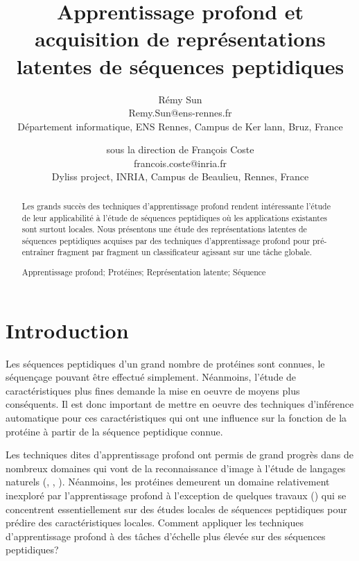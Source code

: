 \documentclass[a4paper, 11pt, onecolumn]{article}
\title{Apprentissage profond et acquisition de représentations latentes de séquences peptidiques}
\author{Rémy Sun \\
  Remy.Sun@ens-rennes.fr \\
  Département informatique, ENS Rennes, Campus de Ker lann, Bruz, France
\and
  sous la direction de Fran\c{c}ois Coste \\
  francois.coste@inria.fr\\
   Dyliss project, INRIA, Campus de Beaulieu, Rennes, France
 }
\newenvironment{keywords}%
{\description\item[Mots-clés.]}%
{\enddescription}
\begin{document}
\begin{titlingpage}
  \maketitle

\begin{abstract}
  Les grands succès des techniques d'apprentissage profond rendent intéressante
  l'étude de leur applicabilité à l'étude de séquences peptidiques où les
  applications existantes sont surtout locales. Nous présentons une étude des
  représentations latentes de séquences peptidiques acquises par des techniques
  d'apprentissage profond pour pré-entraîner fragment par fragment un
  classificateur agissant sur une tâche globale.
  \begin{keywords}
    Apprentissage profond; Protéines; Représentation latente; Séquence
  \end{keywords}
\end{abstract}

\newpage

\tableofcontents

\end{titlingpage}


\section*{Introduction}

Les séquences peptidiques d'un grand nombre de protéines sont connues, le
séquençage pouvant être effectué simplement. Néanmoins, l'étude de caractéristiques plus
fines demande la mise en oeuvre de moyens plus conséquents. Il est donc important de mettre en oeuvre des techniques
d'inférence automatique pour ces caractéristiques qui ont une influence sur la
fonction de la protéine à partir de la séquence peptidique connue.

Les techniques dites d'apprentissage profond ont permis de grand progrès dans de
nombreux domaines qui vont de la reconnaissance d'image à l'étude de langages
naturels (\cite{DBLP:journals/corr/ChoMGBSB14}, \cite{socher2011semi}, \cite{NIPS2014_5346}). Néanmoins, les
protéines demeurent un domaine relativement inexploré par l'apprentissage
profond à l'exception de quelques travaux
(\cite{Spencer:2015:DLN:2817095.2817106}) qui se concentrent essentiellement sur
des études locales de séquences peptidiques pour prédire des caractéristiques
locales. Comment appliquer les techniques d'apprentissage profond à des
tâches d'échelle plus élevée  sur des séquences peptidiques?
\end{document}
